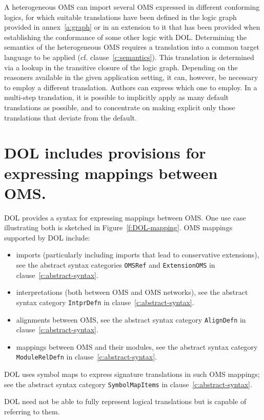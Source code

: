 \documentclass[10pt,fleqn,%
\ifpretendfinal
final%
\else
draft%
\fi,
]{scrreprt}
\makeatletter
\newcommand*{\cf}{cf.\@\xspace}
\newcommand*{\syntax}[1]{\texttt{#1}}
\newcommand{\annexrefname}{annex}
\newcommand{\clauserefname}{clause}
\newcommand{\figurerefname}{Figure}
\newcommand{\aref}[1]{\annexrefname~\ref{#1}}
\newcommand{\cref}[1]{\clauserefname~\ref{#1}}
\newcommand{\fref}[1]{\figurerefname~\ref{#1}}
\makeatother
\begin{document}
A heterogeneous OMS can import several OMS expressed in different
conforming logics, for which suitable translations have been defined
in the logic graph provided in \aref{a:graph} or in an extension to it
that has been provided when establishing the conformance of some other
logic with DOL.  Determining the semantics of the heterogeneous OMS
requires a translation into a common target language to be applied
(\cf \cref{c:semantics}).  This translation is determined via a lookup
in the transitive closure of the logic graph.  Depending on the
reasoners available in the given application setting, it can, however,
be necessary to employ a different translation.  Authors can express
which one to employ.  In a multi-step translation, it is possible to
implicitly apply as many default translations as possible, and to
concentrate on making explicit only those translations that deviate
from the default.

\section{DOL includes provisions for expressing mappings between OMS.}\label{c:req:links}

DOL provides a syntax for expressing mappings between OMS.  One use case illustrating both is sketched in  \fref{f:DOL-mapping}.  OMS mappings supported by DOL include:
\begin{itemize}
\item imports (particularly including imports that lead to conservative extensions), see the
abstract syntax categories \syntax{OMSRef} and \syntax{ExtensionOMS} in
clause~\ref{c:abstract-syntax}.
\item interpretations (both between OMS and OMS networks), see the
abstract syntax category \syntax{IntprDefn} in
clause~\ref{c:abstract-syntax}.
\item alignments between OMS, see the
abstract syntax category \syntax{AlignDefn} in
clause~\ref{c:abstract-syntax}.
\item mappings between OMS and their modules, see the
abstract syntax category \syntax{ModuleRelDefn} in
clause~\ref{c:abstract-syntax}.
\end{itemize}
DOL uses symbol maps to express signature translations in such OMS mappings; see the
abstract syntax category \syntax{SymbolMapItems} in
clause~\ref{c:abstract-syntax}.

DOL need not be able to fully represent logical translations but is
capable of referring to them.
\end{document}
